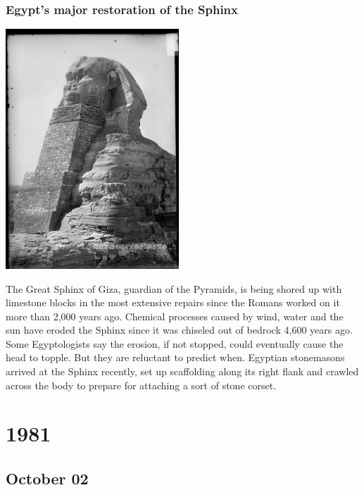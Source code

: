\documentclass[11pt]{report}
\begin{document}
\subsection{Egypt's major restoration of the Sphinx}
\vspace{2mm}\begin{center}\includegraphics[width=6.5cm]{./img/sphinxRestoration.jpg}\end{center}
The Great Sphinx of Giza, guardian of the Pyramids, is being shored up with limestone blocks in the most extensive repairs since the Romans worked on it more than 2,000 years ago.
Chemical processes caused by wind, water and the sun have eroded the Sphinx since it was chiseled out of bedrock 4,600 years ago. Some Egyptologists say the erosion, if not stopped, could eventually cause the head to topple. But they are reluctant to predict when.
Egyptian stonemasons arrived at the Sphinx recently, set up scaffolding along its right flank and crawled across the body to prepare for attaching a sort of stone corset.

\chapter{1981}
\section{October 02}
\end{document}
